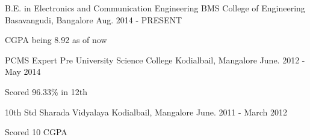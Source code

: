 \begin{cventries}
  \cventry
    {B.E. in Electronics and Communication Engineering}
    {BMS College of Engineering}
    {Basavangudi, Bangalore}
    {Aug. 2014 - PRESENT}
    {
      \begin{cvitems}
        \item {CGPA being 8.92 as of now}
      \end{cvitems}
    }
    \cventry
    {PCMS}
    {Expert Pre University Science College}
    {Kodialbail, Mangalore}
    {June. 2012 - May 2014}
    {
      \begin{cvitems}
        \item {Scored 96.33\% in 12th}
      \end{cvitems}
    }
    \cventry
    {10th Std}
    {Sharada Vidyalaya}
    {Kodialbail, Mangalore}
    {June. 2011 - March 2012}
    {
      \begin{cvitems}
        \item {Scored 10 CGPA}
      \end{cvitems}
    }
\end{cventries}
